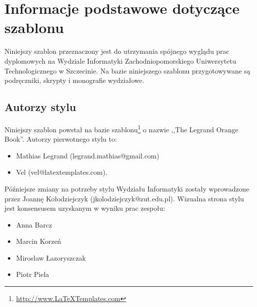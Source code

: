 %


\chapter{Informacje podstawowe dotyczące szablonu}
\label{rozdzial1}

Niniejszy szablon przeznaczony jest do utrzymania spójnego wyglądu prac dyplomowych na Wydziale Informatyki Zachodniopomorskiego Uniwersytetu Technologicznego w Szczecinie. Na bazie niniejszego szablonu przygotowywane są podręczniki, skrypty i monografie wydziałowe.

\section{Autorzy stylu}

Niniejszy szablon powstał na bazie szablonu\footnote{\url{http://www.LaTeXTemplates.com}} o nazwie ,,The Legrand Orange Book''. 
Autorzy pierwotnego stylu to:
\begin{itemize}
\item Mathias Legrand (legrand.mathias@gmail.com)
\item Vel (vel@latextemplates.com).
\end{itemize}

Późniejsze zmiany na potrzeby stylu Wydziału Informatyki zostały wprowadzone przez Joannę Kołodziejczyk (jkolodziejczyk@zut.edu.pl). Wizualna strona stylu  jest konsensusem uzyskanym w wyniku prac zespołu: 
\begin{itemize}
\item Anna Barcz
\item Marcin Korzeń
\item Mirosław Łazoryszczak
\item Piotr Piela
\end{itemize}

